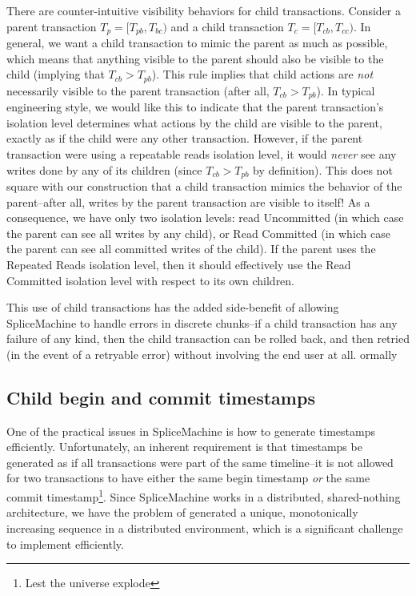 There are counter-intuitive visibility behaviors for child transactions. Consider a parent transaction $T_p = [T_{pb},T_{bc})$  and a child transaction $T_c = [T_{cb},T_{cc})$. In general, we want a child transaction to mimic the parent as much as possible, which means that anything visible to the parent should also be visible to the child (implying that $T_{cb} > T_{pb}$). This rule implies that child actions are \emph{not} necessarily visible to the parent transaction (after all, $T_{cb} > T_{pb}$). In typical engineering style, we would like this to indicate that the parent transaction's isolation level determines what actions by the child are visible to the parent, exactly as if the child were any other transaction. However, if the parent transaction were using a repeatable reads isolation level, it would \emph{never} see any writes done by any of its children (since $T_{cb} > T_{pb}$ by definition). This does not square with our construction that a child transaction mimics the behavior of the parent--after all, writes by the parent transaction are visible to itself! As a consequence, we have only two isolation levels: read Uncommitted (in which case the parent can see all writes by any child), or Read Committed (in which case the parent can see all committed writes of the child). If the parent uses the Repeated Reads isolation level, then it should effectively use the Read Committed isolation level with respect to its own children.

This use of child transactions has the added side-benefit of allowing SpliceMachine to handle errors in discrete chunks--if a child transaction has any failure of any kind, then the child transaction can be rolled back, and then retried (in the event of a retryable error) without involving the end user at all.
ormally
\subsection{Child begin and commit timestamps}
One of the practical issues in SpliceMachine is how to generate timestamps efficiently. Unfortunately, an inherent requirement is that timestamps be generated as if all transactions were part of the same timeline--it is not allowed for two transactions to have either the same begin timestamp \emph{or} the same commit timestamp\footnote{Lest the universe explode}. Since SpliceMachine works in a distributed, shared-nothing architecture, we have the problem of generated a unique, monotonically increasing sequence in a distributed environment, which is a significant challenge to implement efficiently.

